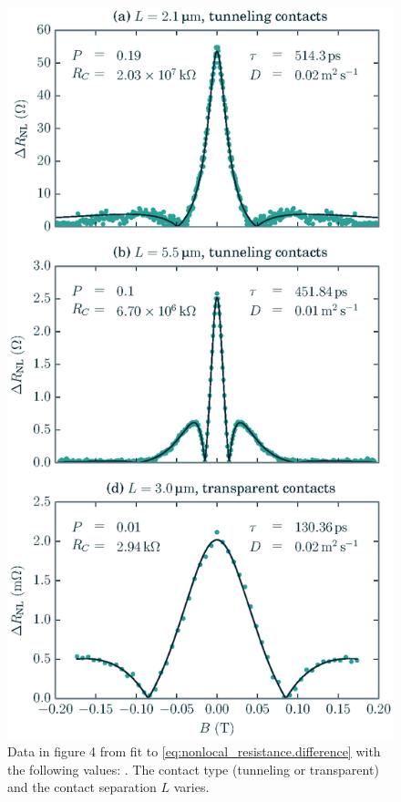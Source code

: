 \begin{figure}[b]
  \caption{
    Data in figure 4 from \cite{PhysRevLett.105.167202}
    fit to \cref{eq:nonlocal_resistance.difference}
    with the following values: \plotDifferenceInfo.
    The contact type (tunneling or transparent)
    and the contact separation $L$ varies.
  }
  \label{fig:nonlocal_resistance.difference}
  \includegraphics[width=\columnwidth]{figures/plot_difference}
\end{figure}

